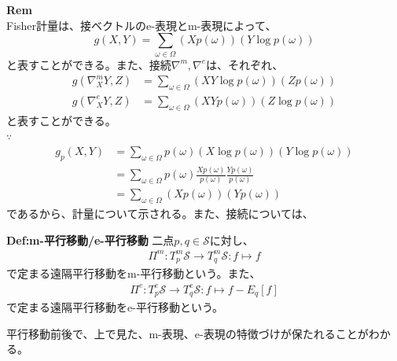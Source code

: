 \documentclass[a4paper,11pt]{jsarticle}
\numberwithin{equation}{section}
\begin{document}
\textbf{Rem}\\
Fisher計量は、接ベクトルのe-表現とm-表現によって、
\begin{equation}
    g(X,Y) = \sum_{\omega \in \Omega} (X p(\omega))(Y \log p(\omega))
\end{equation}
と表すことができる。また、接続$\nabla^{m},\nabla^{e}$は、それぞれ、
\begin{align}
    g(\nabla^{m}_X Y,Z) &= \sum_{\omega \in \Omega} (XY\log p(\omega))(Zp(\omega))\\
    g(\nabla^{e}_X Y,Z) &= \sum_{\omega \in \Omega} (XYp(\omega))(Z\log p(\omega))
\end{align}
と表すことができる。\\
$\because$
\begin{align}
    \label{eq:3}
    g_p(X,Y) &= \sum_{\omega \in \Omega} p(\omega) (X\log p(\omega))(Y\log p(\omega))\\
    &= \sum_{\omega \in \Omega} p(\omega) \frac{Xp(\omega)}{p(\omega)} \frac{Yp(\omega)}{p(\omega)}\\
    &= \sum_{\omega \in \Omega} (Xp(\omega))(Yp(\omega))
\end{align}
であるから、計量について示される。また、接続については、

\begin{itembox}[l]{\textbf{Def:m-平行移動/e-平行移動}}
    二点$p,q \in \mathcal{S}$に対し、
    \begin{align}
        \Pi^{m} : T_p^{m} \mathcal{S} \to T_q^{m} \mathcal{S}:f \mapsto f
    \end{align}
    で定まる遠隔平行移動をm-平行移動という。また、
    \begin{align}
        \Pi^{e} : T_p^{e} \mathcal{S} \to T_q^{e} \mathcal{S}:f \mapsto f-E_q[f]
    \end{align}
    で定まる遠隔平行移動をe-平行移動という。

\end{itembox}
平行移動前後で、上で見た、m-表現、e-表現の特徴づけが保たれることがわかる。\\
\end{document}

